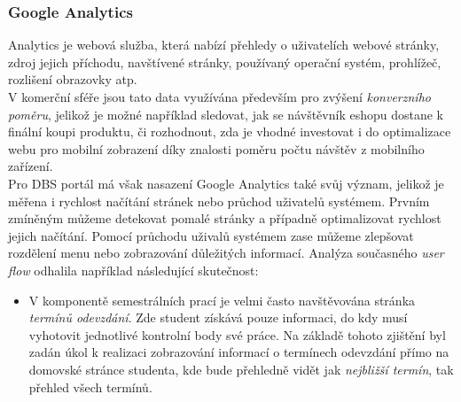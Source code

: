 \subsubsection{Google Analytics}

Analytics \cite{ga} je webová služba, která nabízí přehledy o uživatelích webové stránky, zdroj jejich příchodu, navštívené stránky, používaný operační systém, prohlížeč, rozlišení obrazovky atp.\\
V komerční sféře jsou tato data využívána především pro zvýšení \emph{konverzního poměru}, jelikož je možné například sledovat, jak se návštěvník eshopu dostane k finální koupi produktu, či rozhodnout, zda je vhodné investovat i do optimalizace webu pro mobilní zobrazení díky znalosti poměru počtu návštěv z mobilního zařízení.\\
Pro DBS portál má však nasazení Google Analytics také svůj význam, jelikož je měřena i rychlost načítání stránek nebo průchod uživatelů systémem. Prvním zmíněným můžeme detekovat pomalé stránky a případně optimalizovat rychlost jejich načítání. Pomocí průchodu uživalů systémem zase můžeme zlepšovat rozdělení menu nebo zobrazování důležitých informací. Analýza současného \emph{user flow} odhalila například následující skutečnost:
\begin{itemize}
	\item V komponentě semestrálních prací je velmi často navštěvována stránka \emph{termínů odevzdání}. Zde student získává pouze informaci, do kdy musí vyhotovit jednotlivé kontrolní body své práce. Na základě tohoto zjištění byl zadán úkol k realizaci zobrazování informací o termínech odevzdání přímo na domovské stránce studenta, kde bude přehledně vidět jak \emph{nejbližší termín}, tak přehled všech termínů.
\end{itemize}

